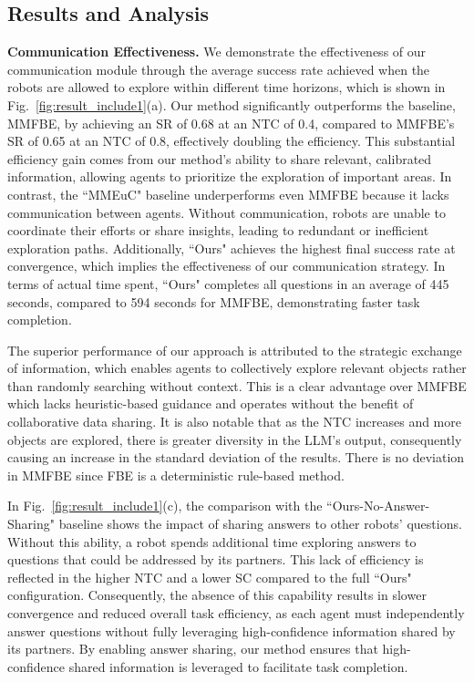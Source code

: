 \subsection{Results and Analysis}

\textbf{Communication Effectiveness.} 
We demonstrate the effectiveness of our communication module through the average success rate achieved when the robots are allowed to explore within different time horizons, which is shown in Fig.~\ref{fig:result_include1}(a). 
Our method significantly outperforms the baseline, MMFBE, by achieving an SR of 0.68 at an NTC of 0.4, compared to MMFBE's SR of 0.65 at an NTC of 0.8, effectively doubling the efficiency. 
This substantial efficiency gain comes from our method's ability to share relevant, calibrated information, allowing agents to prioritize the exploration of important areas. 
In contrast, the ``MMEuC" baseline underperforms even MMFBE because it lacks communication between agents. Without communication, robots are unable to coordinate their efforts or share insights, leading to redundant or inefficient exploration paths.
Additionally, ``Ours" achieves the highest final success rate at convergence, which implies the effectiveness of our communication strategy.
%
In terms of actual time spent, ``Ours" completes all questions in an average of 445 seconds, compared to 594 seconds for MMFBE, demonstrating faster task completion.

The superior performance of our approach is attributed to the strategic exchange of information, which enables agents to collectively explore relevant objects rather than randomly searching without context. This is a clear advantage over MMFBE which lacks heuristic-based guidance and operates without the benefit of collaborative data sharing. It is also notable that as the NTC increases and more objects are explored, there is greater diversity in the LLM's output, consequently causing an increase in the standard deviation of the results. There is no deviation in MMFBE since FBE is a deterministic rule-based method.

In Fig.~\ref{fig:result_include1}(c), the comparison with the ``Ours-No-Answer-Sharing" baseline shows the impact of sharing answers to other robots' questions. Without this ability, a robot spends additional time exploring answers to questions that could be addressed by its partners. This lack of efficiency is reflected in the higher NTC and a lower SC compared to the full ``Ours" configuration. Consequently, the absence of this capability results in slower convergence and reduced overall task efficiency, as each agent must independently answer questions without fully leveraging high-confidence information shared by its partners. By enabling answer sharing, our method ensures that high-confidence shared information is leveraged to facilitate task completion.

